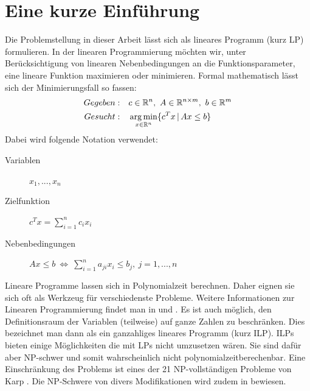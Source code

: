 \section{Eine kurze Einführung}
Die Problemstellung in dieser Arbeit lässt sich als lineares Programm (kurz LP) formulieren. In der linearen Programmierung möchten wir, unter Berücksichtigung von linearen Nebenbedingungen an die Funktionsparameter, eine lineare Funktion maximieren oder minimieren.
Formal mathematisch lässt sich der Minimierungsfall so fassen:
\begin{align*}
Gegeben:&\quad c \in \mathbb{R}^{n},\ A \in \mathbb{R}^{n \times m},\ b \in \mathbb{R}^{m} \\
Gesucht:&\quad \operatorname*{arg\,min}_{ x\in \mathbb{R}^n}\{c^Tx\,|\, Ax \leq b\}
\end{align*}
Dabei wird folgende Notation verwendet:
\begin{description}
	\item[\quad Variablen] $x_1,..., x_n$
	\item[\quad Zielfunktion]  $c^Tx = \sum_{i=1}^n c_i x_i$
	\item[\quad Nebenbedingungen]  $Ax \leq b \ \Leftrightarrow\ \sum_{i=1}^n a_{ji} x_i \leq b_j, \ j = 1,...,n$
\end{description}
Lineare Programme lassen sich in Polynomialzeit berechnen. Daher eignen sie sich oft als Werkzeug für verschiedenste Probleme. 
Weitere Informationen zur Linearen Programmierung findet man in \cite{bertsimas1997introduction} und \cite{schrijver1998theory}.
Es ist auch möglich, den Definitionsraum der Variablen (teilweise) auf ganze Zahlen zu beschränken. Dies bezeichnet man dann als ein ganzahliges lineares Programm (kurz ILP). ILPs bieten einige Möglichkeiten die mit LPs nicht umzusetzen wären. Sie sind dafür aber NP-schwer und somit wahrscheinlich nicht polynomialzeitberechenbar. Eine Einschränkung des Problems ist eines der 21 NP-vollständigen Probleme von Karp \cite{karp1972reducibility}. Die NP-Schwere von divers Modifikationen wird zudem in \cite{schrijver1998theory} bewiesen.

